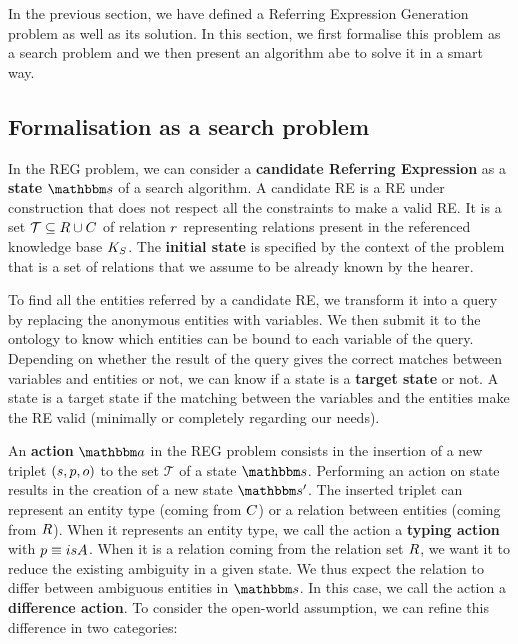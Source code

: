 In the previous section, we have defined a Referring Expression Generation problem as well as its solution. In this section, we first formalise this problem as a search problem and we then present an algorithm abe to solve it in a smart way.

\subsection{Formalisation as a search problem}

In the REG problem, we can consider a \textbf{candidate Referring Expression} as a \textbf{state} $\state$ of a search algorithm. A candidate RE is a RE under construction that does not respect all the constraints to make a valid RE. It is a set $\mathcal{T} \subseteq R \cup C$ of relation $r$ representing relations present in the referenced knowledge base $K_S$. The \textbf{initial state} is specified by the context of the problem that is a set of relations that we assume to be already known by the hearer.

To find all the entities referred by a candidate RE, we transform it into a \sparql{} query by replacing the anonymous entities with variables. We then submit it to the ontology to know which entities can be bound to each variable of the query. Depending on whether the result of the query gives the correct matches between variables and entities or not, we can know if a state is a \textbf{target state} or not. A state is a target state if the matching between the variables and the entities make the RE valid (minimally or completely regarding our needs).

An \textbf{action} $\action$ in the REG problem consists in the insertion of a new triplet $(s, p, o)$ to the set $\mathcal{T}$ of a state $\state$. Performing an action on state results in the creation of a new state $\state'$. The inserted triplet can represent an entity type (coming from $C$) or a relation between entities (coming from $R$). When it represents an entity type, we call the action a \textbf{typing action} with $p \equiv isA$. When it is a relation coming from the relation set $R$, we want it to reduce the existing ambiguity in a given state. We thus expect the relation to differ between ambiguous entities in $\state$. In this case, we call the action a \textbf{difference action}. To consider the open-world assumption, we can refine this difference in two categories:

